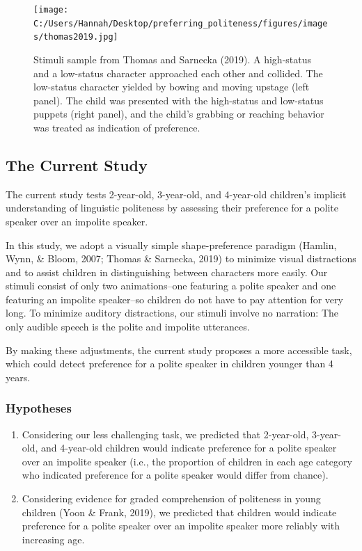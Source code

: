 \documentclass[
  english,
  man,floatsintext]{apa6}
\begin{document}
\newpage

\begin{figure}
\centering
\texttt{[image: C:/Users/Hannah/Desktop/preferring\_politeness/figures/images/thomas2019.jpg]}
\caption{Stimuli sample from Thomas and Sarnecka (2019). A high-status and a low-status character approached each other and collided. The low-status character yielded by bowing and moving upstage (left panel). The child was presented with the high-status and low-status puppets (right panel), and the child's grabbing or reaching behavior was treated as indication of preference.}
\end{figure}

\newpage

\hypertarget{the-current-study}{%
\subsection{The Current Study}\label{the-current-study}}

The current study tests 2-year-old, 3-year-old, and 4-year-old children's implicit understanding of linguistic politeness by assessing their preference for a polite speaker over an impolite speaker.

In this study, we adopt a visually simple shape-preference paradigm (Hamlin, Wynn, \& Bloom, 2007; Thomas \& Sarnecka, 2019) to minimize visual distractions and to assist children in distinguishing between characters more easily. Our stimuli consist of only two animations--one featuring a polite speaker and one featuring an impolite speaker--so children do not have to pay attention for very long. To minimize auditory distractions, our stimuli involve no narration: The only audible speech is the polite and impolite utterances.

By making these adjustments, the current study proposes a more accessible task, which could detect preference for a polite speaker in children younger than 4 years.

\hypertarget{hypotheses}{%
\subsubsection{Hypotheses}\label{hypotheses}}

\begin{enumerate}
\def\labelenumi{\arabic{enumi}.}
\item
  Considering our less challenging task, we predicted that 2-year-old, 3-year-old, and 4-year-old children would indicate preference for a polite speaker over an impolite speaker (i.e., the proportion of children in each age category who indicated preference for a polite speaker would differ from chance).
\item
  Considering evidence for graded comprehension of politeness in young children (Yoon \& Frank, 2019), we predicted that children would indicate preference for a polite speaker over an impolite speaker more reliably with increasing age.
\end{enumerate}
\end{document}
